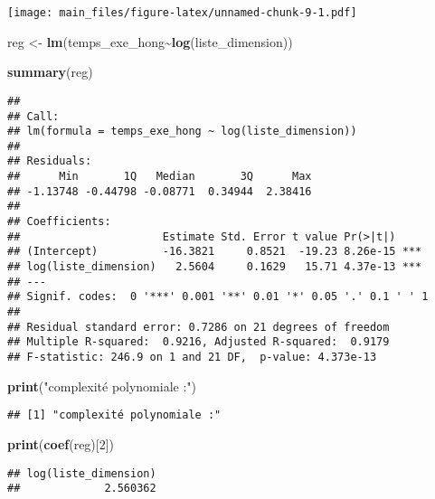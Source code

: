 \documentclass[
]{article}
\newenvironment{Shaded}{\begin{snugshade}}{\end{snugshade}}
\newcommand{\DecValTok}[1]{\textcolor[rgb]{0.00,0.00,0.81}{#1}}
\newcommand{\FunctionTok}[1]{\textcolor[rgb]{0.13,0.29,0.53}{\textbf{#1}}}
\newcommand{\NormalTok}[1]{#1}
\newcommand{\OtherTok}[1]{\textcolor[rgb]{0.56,0.35,0.01}{#1}}
\newcommand{\SpecialCharTok}[1]{\textcolor[rgb]{0.81,0.36,0.00}{\textbf{#1}}}
\newcommand{\StringTok}[1]{\textcolor[rgb]{0.31,0.60,0.02}{#1}}
\begin{document}
\texttt{[image: main\_files/figure-latex/unnamed-chunk-9-1.pdf]}

\begin{Shaded}
\begin{Highlighting}[]
\NormalTok{reg }\OtherTok{\textless{}{-}} \FunctionTok{lm}\NormalTok{(temps\_exe\_hong}\SpecialCharTok{\textasciitilde{}}\FunctionTok{log}\NormalTok{(liste\_dimension))}

\FunctionTok{summary}\NormalTok{(reg)}
\end{Highlighting}
\end{Shaded}

\begin{verbatim}
## 
## Call:
## lm(formula = temps_exe_hong ~ log(liste_dimension))
## 
## Residuals:
##      Min       1Q   Median       3Q      Max 
## -1.13748 -0.44798 -0.08771  0.34944  2.38416 
## 
## Coefficients:
##                      Estimate Std. Error t value Pr(>|t|)    
## (Intercept)          -16.3821     0.8521  -19.23 8.26e-15 ***
## log(liste_dimension)   2.5604     0.1629   15.71 4.37e-13 ***
## ---
## Signif. codes:  0 '***' 0.001 '**' 0.01 '*' 0.05 '.' 0.1 ' ' 1
## 
## Residual standard error: 0.7286 on 21 degrees of freedom
## Multiple R-squared:  0.9216, Adjusted R-squared:  0.9179 
## F-statistic: 246.9 on 1 and 21 DF,  p-value: 4.373e-13
\end{verbatim}

\begin{Shaded}
\begin{Highlighting}[]
\FunctionTok{print}\NormalTok{(}\StringTok{"complexité polynomiale :"}\NormalTok{)}
\end{Highlighting}
\end{Shaded}

\begin{verbatim}
## [1] "complexité polynomiale :"
\end{verbatim}

\begin{Shaded}
\begin{Highlighting}[]
\FunctionTok{print}\NormalTok{(}\FunctionTok{coef}\NormalTok{(reg)[}\DecValTok{2}\NormalTok{])}
\end{Highlighting}
\end{Shaded}

\begin{verbatim}
## log(liste_dimension) 
##             2.560362
\end{verbatim}

\hypertarget{section-16}{%
\subsection{}\label{section-16}}
\end{document}
